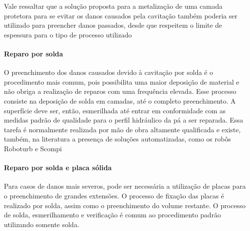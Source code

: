 Vale ressaltar que a solução proposta para a metalização de uma camada protetora
para se evitar os danos causados pela cavitação também poderia ser utilizado
para preencher danos passados, desde que respeitem o limite de espessura
para o tipo de processo utilizado


\paragraph{Reparo por solda}

O preenchimento dos danos causados devido à cavitação por solda é o procedimento
mais comum, pois possibilita uma maior deposição de material e não obriga a
realização de reparos com uma frequência elevada. Esse processo consiste na
deposição de solda em camadas, até o completo preenchimento. A
superfície deve ser, então, esmerilhada até entrar em conformidade com as
medidas padrão de qualidade para o perfil hidráulico da pá a ser reparada. Essa tarefa
é normalmente realizada por mão de obra altamente qualificada e existe, também,
na literatura a presença de soluções automatizadas, como os robôs Roboturb e Scompi
\citep{roboturb,scompi}

\paragraph{Reparo por solda e placa sólida}

Para casos de danos mais severos, pode ser necessária a utilização de placas
para o preenchimento de grandes extensões. O processo de fixação das placas é
realizado por solda, assim como o preenchimento do volume restante. O processo
de solda, esmerilhamento e verificação é comum ao procedimento padrão utilizando
somente solda.















